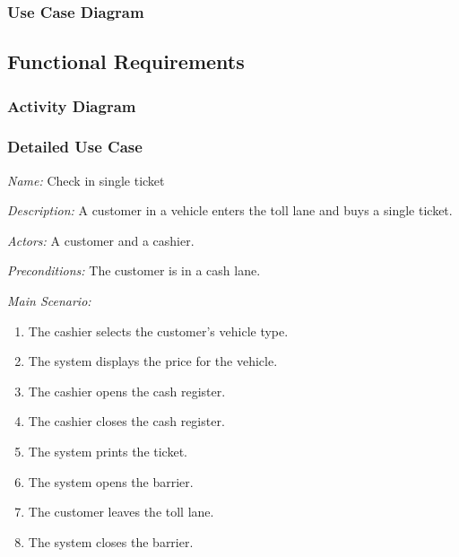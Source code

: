 \subsubsection {Use Case Diagram}

\subsection{Functional Requirements}

\subsubsection{Activity Diagram}

\subsubsection{Detailed Use Case}



\textit {Name: } Check in single ticket

\textit {Description: } A customer in a vehicle enters the toll lane and buys a single ticket.

\textit {Actors: } A customer and a cashier.

\textit {Preconditions: }  The customer is in a cash lane.

\textit{Main Scenario: }

\begin{enumerate}
	\item The cashier selects the customer's vehicle type.
	\item The system displays the price for the vehicle.
	\item The cashier opens the cash register.
	\item The cashier closes the cash register.
	\item The system prints the ticket.
	\item The system opens the barrier.
	\item The customer leaves the toll lane.
	\item The system closes the barrier.
\end{enumerate}

